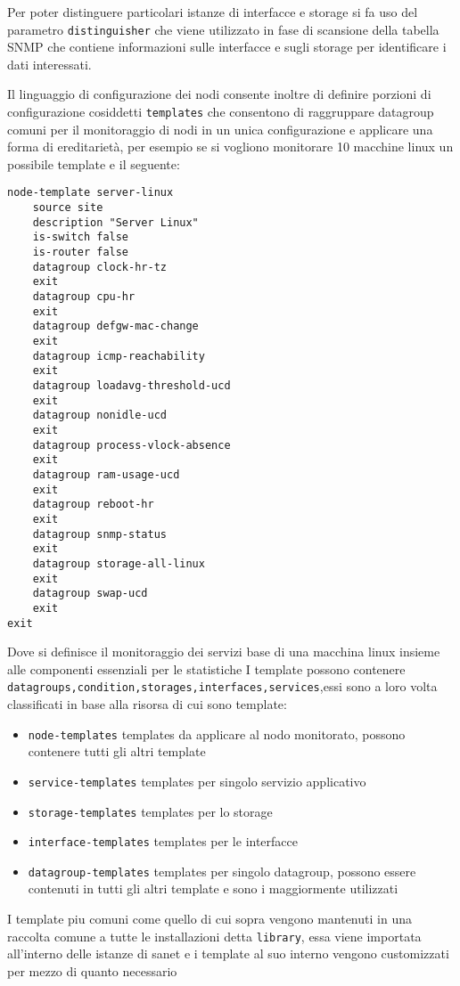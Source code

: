 \documentclass[12pt,a4paper,twoside,openright]{book}
\begin{document}
Per poter distinguere particolari istanze di interfacce e storage si fa uso del parametro \verb|distinguisher| che viene utilizzato in fase di scansione della tabella SNMP che contiene informazioni sulle interfacce e sugli storage per identificare i dati interessati.

Il linguaggio di configurazione dei nodi consente inoltre di definire porzioni di configurazione cosiddetti \verb|templates| che consentono di raggruppare datagroup comuni per il monitoraggio di nodi in un unica configurazione e applicare una forma di ereditarietà, per esempio se si vogliono monitorare 10 macchine linux un possibile template e il seguente:


\begin{lstlisting}
node-template server-linux
    source site
    description "Server Linux"
    is-switch false
    is-router false
    datagroup clock-hr-tz
    exit
    datagroup cpu-hr
    exit
    datagroup defgw-mac-change
    exit
    datagroup icmp-reachability
    exit
    datagroup loadavg-threshold-ucd
    exit
    datagroup nonidle-ucd
    exit
    datagroup process-vlock-absence
    exit
    datagroup ram-usage-ucd
    exit
    datagroup reboot-hr
    exit
    datagroup snmp-status
    exit
    datagroup storage-all-linux
    exit
    datagroup swap-ucd
    exit
exit
\end{lstlisting}

Dove si definisce il monitoraggio dei servizi base di una macchina linux insieme alle componenti essenziali per le statistiche
I template possono contenere \verb|datagroups,condition,storages,interfaces,services|,essi sono a loro volta classificati in base alla risorsa di cui sono template:

\begin{itemize}
  \item \verb|node-templates| templates da applicare al nodo monitorato, possono contenere tutti gli altri template
  \item \verb|service-templates| templates per singolo servizio applicativo
  \item \verb|storage-templates| templates per lo storage
  \item \verb|interface-templates| templates per le interfacce
  \item \verb|datagroup-templates| templates per singolo datagroup, possono essere contenuti in tutti gli altri template e sono i maggiormente utilizzati
\end{itemize}

I template piu comuni come quello di cui sopra vengono mantenuti in una raccolta comune a tutte le installazioni detta \verb|library|, essa viene importata all'interno delle istanze di sanet e i template al suo interno vengono customizzati per mezzo di quanto necessario
\end{document}
